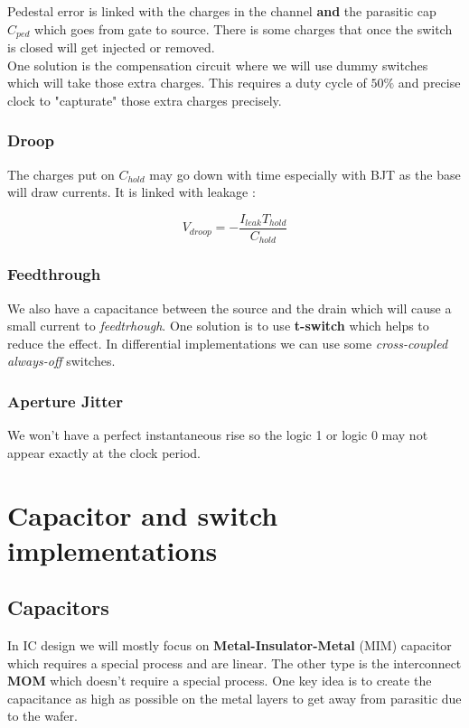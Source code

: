 \documentclass{report}
\begin{document}
Pedestal error is linked with the charges in the channel \textbf{and} the parasitic cap $C_{ped}$ which goes from gate to source. There is some charges that once the switch is closed will get injected or removed.\\
One solution is the compensation circuit where we will use dummy switches which will take those extra charges. This requires a duty cycle of $50\%$ and precise clock to "capturate" those extra charges precisely.

\subsubsection{Droop}

The charges put on $C_{hold}$ may go down with time especially with BJT as the base will draw currents. It is linked with leakage : 

\begin{equation}
    V_{droop} = -\frac{I_{leak} T_{hold}}{C_{hold}}
\end{equation}

\subsubsection{Feedthrough}

 We also have a capacitance between the source and the drain which will cause a small current to \textit{feedtrhough}. One solution is to use \textbf{t-switch} which helps to reduce the effect. In differential implementations we can use some \textit{cross-coupled always-off} switches. 

 \subsubsection{Aperture Jitter}

We won't have a perfect instantaneous rise so the logic 1 or logic 0 may not appear exactly at the clock period.


\section{Capacitor and switch implementations}

\subsection{Capacitors}

In IC design we will mostly focus on \textbf{Metal-Insulator-Metal} (MIM) capacitor which requires a special process and are linear. The other type is the interconnect \textbf{MOM} which doesn't require a special process. One key idea is to create the capacitance as high as possible on the metal layers to get away from parasitic due to the wafer.\\
\end{document}
